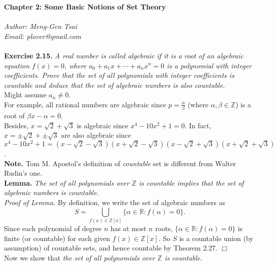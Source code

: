 \documentclass{article}
\begin{document}
\textbf{\Large Chapter 2: Some Basic Notions of Set Theory} \\\\



\emph{Author: Meng-Gen Tsai} \\
\emph{Email: plover@gmail.com} \\\\



\textbf{Exercise 2.15.}
\emph{A real number is called algebraic
if it is a root of an algebraic equation $f(x) = 0$,
where $a_0 + a_1 x + \cdots + a_n x^n = 0$ is a polynomial with integer coefficients.
Prove that the set of all polynomials with integer coefficients is countable
and deduce that the set of algebraic numbers is also countable.} \\

Might assume $a_n \neq 0$. \\

For example, all rational numbers are algebraic
since $p = \frac{\alpha}{\beta}$ (where $\alpha, \beta \in \mathbb{Z}$)
is a root of $\beta x - \alpha = 0$. \\

Besides, $x = \sqrt{2} + \sqrt{3}$ is algebraic since $x^4 - 10x^2 + 1 = 0$.
In fact, $x = \pm\sqrt{2} + \pm\sqrt{3}$ are also algebraic since
$x^4 - 10x^2 + 1 =
(x - \sqrt{2} - \sqrt{3})(x + \sqrt{2} - \sqrt{3})
(x - \sqrt{2} + \sqrt{3})(x + \sqrt{2} + \sqrt{3})$. \\

\textbf{Note.} Tom M. Apostol's definition of \emph{countable} set is different from
Walter Rudin's one. \\

\textbf{Lemma.}
\emph{The set of all polynomials over $\mathbb{Z}$ is countable implies that
the set of algebraic numbers is countable.} \\

\emph{Proof of Lemma.}
By definition, we write the set of algebraic numbers as
$$S = \bigcup_{f(x) \in \mathbb{Z}[x]} \{ \alpha \in \mathbb{R} : f(\alpha) = 0 \}.$$
Since each polynomial of degree $n$ has at most $n$ roots,
$\{ \alpha \in \mathbb{R} : f(\alpha) = 0 \}$ is finite (or countable)
for each given $f(x) \in \mathbb{Z}[x]$.
So $S$ is a countable union (by assumption) of countable sets, and hence countable
by Theorem 2.27.
$\Box$ \\

Now we show that
\emph{the set of all polynomials over $\mathbb{Z}$ is countable.} \\
\end{document}

